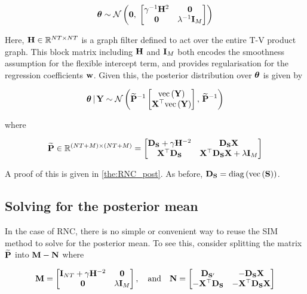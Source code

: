 \begin{equation}
    \label{eq:theta_prior}
    \boldsymbol{\theta} \sim \mathcal{N}\left( \mathbf{0}, \; \begin{bmatrix} \gamma^{-1} \mathbf{H}^2 & \mathbf{0} \\ \mathbf{0} & \lambda^{-1} \mathbf{I}_M \end{bmatrix} \right)
\end{equation}

Here, $\mathbf{H} \in \mathbb{R}^{NT \times NT}$ is a graph filter defined to act over the entire T-V product graph. This block matrix including $\mathbf{H}$ and $\mathbf{I}_M$ both encodes the smoothness assumption for the flexible intercept term, and provides regularisation for the regression coefficients $\mathbf{w}$. Given this, the posterior distribution over $\boldsymbol{\theta}$ is given by 

\begin{equation}
    \boldsymbol{\theta} \, | \, \mathbf{Y} \sim \mathcal{N}\left(\widetilde{\mathbf{P}}^{-1} \begin{bmatrix} \text{\textup{vec}}\left(\mathbf{Y}\right) \\ \mathbf{X}^\top \text{\textup{vec}}\left(\mathbf{Y}\right) \end{bmatrix}, \, \widetilde{\mathbf{P}}^{-1}\right)
\end{equation}

where 

\begin{equation}
    \widetilde{\mathbf{P}} \in \mathbb{R}^{(NT + M) \times (NT + M)}= 
    \begin{bmatrix}
     \mathbf{D}_{\mathbf{S}} + \gamma \mathbf{H}^{-2} & \mathbf{D}_{\mathbf{S}}  \mathbf{X} \\
     \mathbf{X}^\top \mathbf{D}_{\mathbf{S}} & \mathbf{X}^\top \mathbf{D}_{\mathbf{S}} \mathbf{X} + \lambda \mathbf{I}_M   
    \end{bmatrix}
\end{equation}


A proof of this is given in \cref{the:RNC_post}. As before, $\mathbf{D}_{\mathbf{S}} = \text{\textup{diag}}\left(\text{\textup{vec}}\left(\mathbf{S}\right)\right)$. 
    
\subsection{Solving for the posterior mean}

In the case of RNC, there is no simple or convenient way to reuse the SIM method to solve for the posterior mean. To see this, consider splitting the matrix $\widetilde{\mathbf{P}}$ into $\mathbf{M} - \mathbf{N}$ where 

\begin{equation*}
    \mathbf{M} = 
    \begin{bmatrix}
        \mathbf{I}_{NT} + \gamma \mathbf{H}^{-2} & \mathbf{0} \\
        \mathbf{0} & \lambda \mathbf{I}_M   
       \end{bmatrix}, 
       \quad \text{and} \quad \mathbf{N} = \begin{bmatrix}
        \mathbf{D}_{\mathbf{S}'} & -\mathbf{D}_{\mathbf{S}}  \mathbf{X} \\
        -\mathbf{X}^\top \mathbf{D}_{\mathbf{S}} & -\mathbf{X}^\top\mathbf{D}_{\mathbf{S}} \mathbf{X} 
       \end{bmatrix}
\end{equation*}

